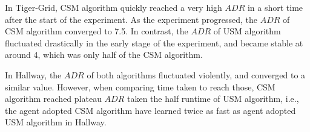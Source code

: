 \documentclass[conference]{IEEEtran}
\begin{document}
%	
	
	In Tiger-Grid, CSM algorithm quickly reached a very high $ADR$ in a short
	time after the start of the experiment. As the experiment progressed, the $ADR$ of
	CSM algorithm converged to 7.5. In contrast, the $ADR$ of USM algorithm fluctuated
	drastically in the early stage of the experiment, and became stable at around 4, which
	was only half of the CSM algorithm.
	
	In Hallway, the $ADR$ of both algorithms fluctuated violently,  
	and converged to a similar value. However, when comparing time taken to reach those,
	CSM algorithm reached plateau $ADR$ taken the half runtime of USM algorithm, i.e.,
	the agent adopted CSM algorithm have learned twice as fast as agent adopted USM algorithm
	in Hallway.
	
\end{document}
